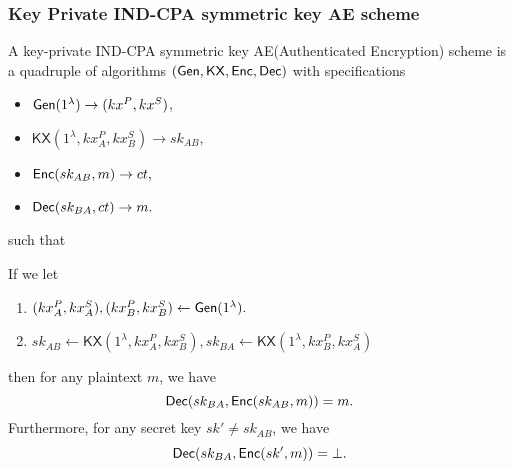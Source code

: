 \subsubsection{Key Private IND-CPA symmetric key AE scheme}
A key-private IND-CPA symmetric key AE(Authenticated Encryption) scheme is a quadruple of algorithms $(\mathsf{Gen}, \mathsf{KX}, \mathsf{Enc}, \mathsf{Dec})$ with specifications
\begin{itemize}
    \item $\mathsf{Gen}(1^{\lambda}) \to (kx^P, kx^S)$,
    \item $\mathsf{KX}(1^{\lambda}, kx_A^P, kx_B^S) \to sk_{AB},$
    \item $\mathsf{Enc}(sk_{AB}, m) \to ct,$
    \item $\mathsf{Dec}(sk_{BA}, ct) \to m.$
\end{itemize}
such that 
\begin{definition}[Correctness]
\label{defn:KX-Correctness}
If we let
\begin{enumerate}
    \item $(kx^P_A, kx_A^S), (kx^P_B, kx_B^S)  \leftarrow \mathsf{Gen}(1^{\lambda}).$
    \item $sk_{AB} \leftarrow \mathsf{KX}(1^{\lambda}, kx_A^P, kx_B^S), sk_{BA} \leftarrow \mathsf{KX}(1^{\lambda}, kx_B^P, kx_A^S)$
\end{enumerate}
then for any plaintext $m$, we have
$$\mathsf{Dec}(sk_{BA}, \mathsf{Enc}(sk_{AB}, m)) = m.$$
Furthermore, for any secret key $sk' \neq sk_{AB}$, we have
$$\mathsf{Dec}(sk_{BA}, \mathsf{Enc}(sk', m)) = \bot.$$
\end{definition}
